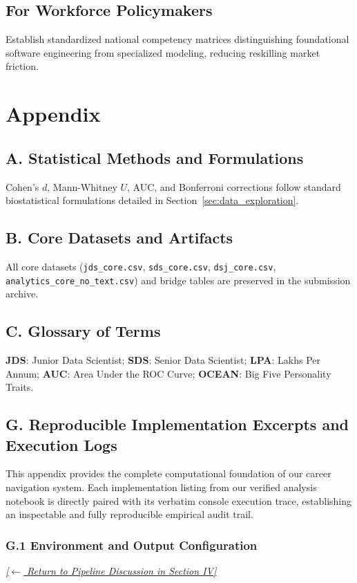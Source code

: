 \documentclass[conference]{IEEEtran}
\begin{document}
\subsection{For Workforce Policymakers}
Establish standardized national competency matrices distinguishing foundational software engineering from specialized modeling, reducing reskilling market friction.

\section*{Appendix}

\subsection*{A. Statistical Methods and Formulations}
Cohen's $d$, Mann-Whitney $U$, AUC, and Bonferroni corrections follow standard biostatistical formulations detailed in Section~\ref{sec:data_exploration}.

\subsection*{B. Core Datasets and Artifacts}
All core datasets (\texttt{jds\_core.csv}, \texttt{sds\_core.csv}, \texttt{dsj\_core.csv}, \texttt{analytics\_core\_no\_text.csv}) and bridge tables are preserved in the submission archive.

\subsection*{C. Glossary of Terms}
\textbf{JDS}: Junior Data Scientist; \textbf{SDS}: Senior Data Scientist; \textbf{LPA}: Lakhs Per Annum; \textbf{AUC}: Area Under the ROC Curve; \textbf{OCEAN}: Big Five Personality Traits.

\subsection*{G. Reproducible Implementation Excerpts and Execution Logs}
\label{sec:appendix_g}

This appendix provides the complete computational foundation of our career navigation system. Each implementation listing from our verified analysis notebook is directly paired with its verbatim console execution trace, establishing an inspectable and fully reproducible empirical audit trail.

\subsubsection*{G.1 Environment and Output Configuration}
\label{lst:setup}
\textit{\hyperref[sec:pipeline]{[$\leftarrow$ Return to Pipeline Discussion in Section IV]}}
\end{document}
